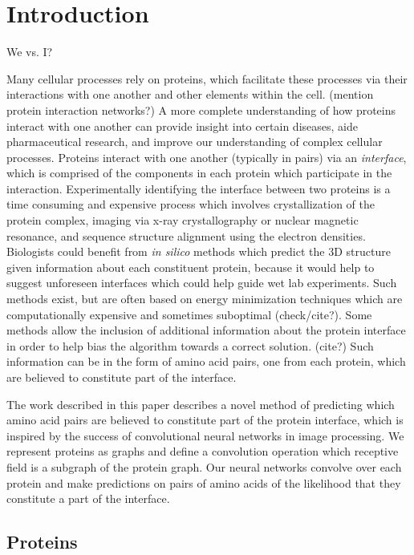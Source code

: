 \chapter{Introduction}
\label{chap:intro}

We vs. I?

Many cellular processes rely on proteins, which facilitate these processes via their interactions with one another and other elements within the cell. 
(mention protein interaction networks?)
A more complete understanding of how proteins interact with one another can provide insight into certain diseases, aide pharmaceutical research, and improve our understanding of complex cellular processes. 
Proteins interact with one another (typically in pairs) via an \textit{interface}, which is comprised of the components in each protein which participate in the interaction.
Experimentally identifying the interface between two proteins is a time consuming and expensive process which involves crystallization of the protein complex, imaging via x-ray crystallography or nuclear magnetic resonance, and sequence structure alignment using the electron densities.
Biologists could benefit from \textit{in silico} methods which predict the 3D structure given information about each constituent protein, because it would help to suggest unforeseen interfaces which could help guide wet lab experiments.
Such methods exist, but are often based on energy minimization techniques which are computationally expensive and sometimes suboptimal (check/cite?).
Some methods allow the inclusion of additional information about the protein interface in order to help bias the algorithm towards a correct solution. (cite?)
Such information can be in the form of amino acid pairs, one from each protein, which are believed to constitute part of the interface.

The work described in this paper describes a novel method of predicting which amino acid pairs are believed to constitute part of the protein interface, which is inspired by the success of convolutional neural networks in image processing. 
We represent proteins as graphs and define a convolution operation which receptive field is a subgraph of the protein graph.
Our neural networks convolve over each protein and make predictions on pairs of amino acids of the likelihood that they constitute a part of the interface. 

\section{Proteins}

